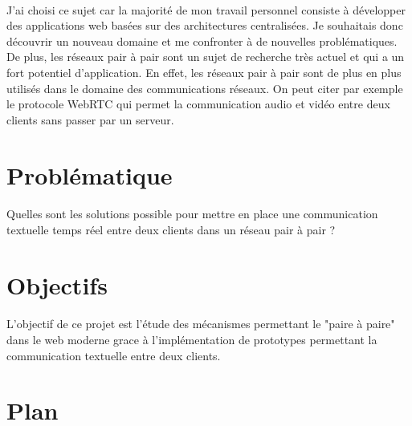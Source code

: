 \paragraph{}
J'ai choisi ce sujet car la majorité de mon travail personnel consiste à développer des applications web basées sur des architectures centralisées. Je souhaitais donc découvrir un nouveau
domaine et me confronter à de nouvelles problématiques. De plus, les réseaux pair à pair sont un sujet de recherche très actuel et qui a un fort potentiel d'application. En effet,
les réseaux pair à pair sont de plus en plus utilisés dans le domaine des communications réseaux. On peut citer par exemple le protocole WebRTC qui permet la communication audio et vidéo
entre deux clients sans passer par un serveur.


\section{Problématique}

\paragraph{}

Quelles sont les solutions possible pour mettre en place une communication textuelle temps réel entre deux clients dans un réseau pair à pair ?

\section{Objectifs}

\paragraph{}

L'objectif de ce projet est l'étude des mécanismes permettant le "paire à paire" dans le web moderne grace à l'implémentation de prototypes permettant la communication textuelle entre deux clients.

\section{Plan}

